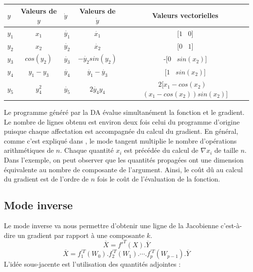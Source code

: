 \vspace{1cm}
\begin{tabular}{|l|c|l|c|c|}
  \hline
  $y$ & Valeurs de $y$ & $\dot{y}$ & Valeurs de $\dot{y}$ & Valeurs vectorielles
\\
  \hline
  $y_1$ &  $x_1$ &  $\dot{y_1}$ & $\dot{x_1}$ & [$1$ \ $0$] \\
  $y_2$ & $x_2$ & $\dot{y_2}$ & $\dot{x_2}$ & [$0$ \ $1$] \\
  $y_3$ & $cos(y_2)$ & $\dot{y_3}$ & $-\dot{y_2}sin(y_2)$ & -[$0$ \ $sin(x_2)$]
\\
  $y_4$ & $y_1-y_3$ & $\dot{y_4}$ & $\dot{y_1}-\dot{y_3}$ & [$1$ \ $sin(x_2)$]
\\
  $y_5$ & $y_4^2$ &  $\dot{y_5}$ & $2\dot{y_4}y_4$ & $2$[$x_1-cos(x_2)$ \
$(x_1-cos(x_2))sin(x_2)$]\\
  
  \hline
\end{tabular}



\vspace{1cm}

Le programme g\'en\'er\'e par la DA \'evalue simultan\'ement la fonction et le gradient. Le nombre de lignes obtenu
est environ deux fois celui du programme d'origine puisque chaque affectation est accompagn\'ee du calcul du
gradient. En g\'en\'eral, comme c'est expliqu\'e dans \cite{Iri89onautomatic}, le mode tangent multiplie le nombre
 d'op\'erations arithm\'etiques de $n$. Chaque quantit\'e 
$x_i$ est pr\'ec\'ed\'ee du calcul de $\nabla x_i$ de taille $n$. Dans l'exemple, on peut observer que les quantit\'es propag\'ees ont 
une dimension \'equivalente au nombre de composante de l'argument. Ainsi, le coût dû au calcul du gradient est de l'ordre de 
$n$ fois le co\^ut de l'\'evaluation de la fonction.
\vspace{0.51cm}




% 

    \subsection{Mode inverse}
Le mode inverse va nous permettre d'obtenir une ligne de la Jacobienne c'est-\`a-dire un gradient par rapport \`a 
une composante $k$.
$$\overline{X}=f'^T(X).\overline{Y}$$ 
\begin{equation}\overline{X}=f_{1}^{'T}(W_{0}) . f_{2}^{'T}(W_{1}) . \cdots .f_p^{'T}(W_{p-1}) . \overline{Y}
\label{eq:inv}
\end{equation}
L'id\'ee sous-jacente est l'utilisation des quantit\'es adjointes :

